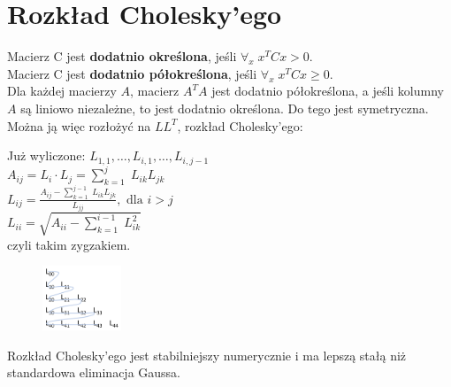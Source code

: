 \section{Rozkład Cholesky’ego}
Macierz C jest \textbf{dodatnio określona}, jeśli \( \forall_x\; x^TCx > 0 \). \\
Macierz C jest \textbf{dodatnio półokreślona}, jeśli \( \forall_x\; x^TCx \geq 0 \). \\
Dla każdej macierzy \( A \), macierz \( A^TA \) jest dodatnio półokreślona, a jeśli kolumny \( A \) są liniowo niezależne, to jest dodatnio określona. Do tego jest symetryczna. Można ją więc rozłożyć na \( LL^T \), rozkład Cholesky'ego:
\begin{multicols}{2}
	\noindent
	Już wyliczone: \( L_{1,1}, \dots, L_{i,1}, \dots, L_{i, j-1} \) \\
	\( A_{ij} = L_i \cdot L_j = \sum_{k=1}^{j}\; L_{ik}L_{jk} \) \\
	\( L_{ij} = \frac{A_{ij} - \sum_{k=1}^{j-1}\; L_{ik}L_{jk}}{L_{jj}}, \text{ dla } i > j \) \\
	\( L_{ii} = \sqrt{A_{ii} - \sum_{k=1}^{i-1}\; L_{ik}^2} \) \\
	\columnbreak
	czyli takim zygzakiem.
	\begin{figure}[H]
		\includegraphics[width=0.21\textwidth]{img/cholesky.png}
	\end{figure}
\end{multicols}
\noindent
Rozkład Cholesky’ego jest stabilniejszy numerycznie i ma lepszą stałą niż standardowa eliminacja Gaussa.
